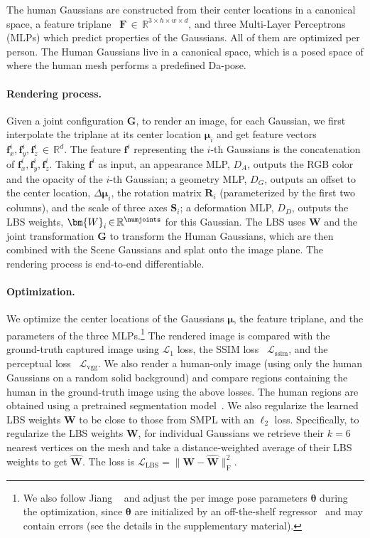 The human Gaussians are constructed from their center locations in a canonical space, a feature triplane~\cite{Peng2020ECCV,Chan2022} $\bm{F} \, {\in} \, \mathbb{R}^{3{\times}h{\times}w{\times}d}$, and three Multi-Layer Perceptrons (MLPs) which predict properties of the Gaussians.
%
All of them are optimized per person.
%
The Human Gaussians live in a canonical space, which is a posed space of \smpl where the human mesh performs a predefined Da-pose.
%


\paragraph{Rendering process.} Given a joint configuration $\bm G$, to render an image, for each Gaussian, we first interpolate the triplane at its center location $\bm{\mu}_i$ and get feature vectors $\bm{f}_x^i, \bm{f}_y^i, \bm{f}_z^i \, {\in} \, \mathbb{R}^d$.
%
The feature $\bm{f}^i$ representing the $i$-th Gaussians is the concatenation of $\bm{f}_x^i, \bm{f}_y^i, \bm{f}_z^i$.
%
Taking $\bm{f}^i$ as input, an appearance MLP, $D_A$, outputs the RGB color and the opacity of the $i$-th Gaussian; a geometry MLP, $D_G$, outputs an offset to the center location, $\Delta \bm{\mu}_i$, the rotation matrix $\bm{R}_i$ (parameterized by the first two columns), and the scale of three axes $\bm{S}_i$; a deformation MLP, $D_D$, outputs the LBS weights, $\bm{W}_i \, {\in} \, \mathbb{R}^{\numjoints}$ for this Gaussian.
%
The LBS uses $\bm{W}$ and the joint transformation $\bm G$ to transform the Human Gaussians, which are then combined with the Scene Gaussians and splat onto the image plane.
%
The rendering process is end-to-end differentiable. 


\paragraph{Optimization.} We optimize the center locations of the Gaussians $\bm{\mu}$, the feature triplane, and the parameters of the three MLPs.\footnote{We also follow Jiang \etal~\cite{jiang2022neuman} and adjust the per image \smpl pose parameters $\bm{\theta}$ during the optimization, since $\bm{\theta}$ are initialized by an off-the-shelf \smpl regressor~\cite{goel2023humans4d} and may contain errors (see the details in the supplementary material).}
%
The rendered image is compared with the ground-truth captured image using $\mathcal{L}_1$ loss, the SSIM loss~\cite{ssim} $\mathcal{L}_{\text{ssim}}$, and the perceptual loss~\cite{simonyan2015vgg} $\mathcal{L}_{\text{vgg}}$. 
%
We also render a human-only image (using only the human Gaussians on a random solid background) and compare regions containing the human in the ground-truth image using the above losses.
%
The human regions are obtained using a pretrained segmentation model~\cite{kirillov2023segmentanything}. 
%
We also regularize the learned LBS weights $\bm{W}$ to be close to those from SMPL with an $\ell_2$ loss.
%
Specifically, to regularize the LBS weights $\bm{W}$, for individual Gaussians we retrieve their $k=6$ nearest vertices on the \smpl mesh and take a distance-weighted average of their LBS weights to get $\hat{\bm{W}}$. The loss is $\mathcal{L}_{\text{LBS}} = \| \bm{W} - \hat{\bm{W}} \|_{\text{F}}^2$.

